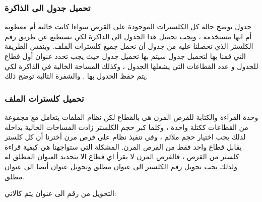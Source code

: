 \documentclass[document.tex]{subfiles}
\begin{document}
\subsubsection{تحميل جدول  الى الذاكرة}
جدول  يوضح حالة كل الكلسترات الموجودة على القرص سواءا كانت خالية أم معطوبة أم انها مستخدمة ، ويجب تحميل هذا الجدول الى الذاكرة لكي نستطيع عن طريق رقم الكلستر الذي تحصلنا عليه من جدول  أن نحمل جميع كلسترات الملف.
وبنفس الطريقة التي قمنا بها لتحميل جدول  سيتم بها تحميل جدول  حيث يجب تحدد عنوان أول قطاع للجدول و عدد القطاعات التي يشغلها الجدول ، وكذلك المساحة الخالية في الذاكرة لكي يتم حفظ الحدول بها . والشفرة التالية توضح ذلك.

\begin{english}
\lstset{numberstyle=\tiny,numbers=left,stepnumber=1,numbersep=5pt,tabsize=2,extendedchars=true,breaklines=true,frame=b,showspaces=false, showtabs=false,xleftmargin=10pt,framexleftmargin=10pt,framexrightmargin=5pt,framexbottommargin=4pt,showstringspaces=false,language=[x86masm]Assembler}


\end{english}

\subsubsection{تحميل كلسترات الملف}
وحدة القراءة والكتابة للقرص المرن هي بالقطاع  لكن نظام الملفات  يتعامل مع مجموعة من القطاعات ككتلة واحدة ، وكلما كبر حجم الكلستر زادت المساحات الخالية بداخله  لذلك يجب اختيار حجم ملائم ، وفي تنفيذ نظام  على قرص مرن أخترنا أن كل كلستر يقابل قطاع واحد فقط من القرص المرن.
المشكلة التي ستواجهنا هي كيفية قراءة كلستر من القرص ، فالقرص المرن لا يقرأ اي قطاع الا بتحديد العنوان المطلق له  ولذلك يجب تحويل رقم الكلستر الى عنوان مطلق وتحويل عنوان  أيضا الى عنوان مطلق.

التحويل من رقم  الى عنوان  يتم كالاتي:

\begin{english}
\lstset{numberstyle=\tiny,numbers=left,stepnumber=1,numbersep=5pt,tabsize=2,extendedchars=true,breaklines=true,frame=b,showspaces=false, showtabs=false,xleftmargin=10pt,framexleftmargin=10pt,framexrightmargin=5pt,framexbottommargin=4pt,showstringspaces=false,language=[x86masm]Assembler}


\end{english}
\end{document}
